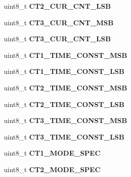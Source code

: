 \begin{DoxyCompactItemize}
uint8\+\_\+t {\bfseries C\+T2\+\_\+\+C\+U\+R\+\_\+\+C\+N\+T\+\_\+\+L\+SB}
\item 
\mbox{\label{structz8036__map_aee4739d98749539047473eef94277364}} 
uint8\+\_\+t {\bfseries C\+T3\+\_\+\+C\+U\+R\+\_\+\+C\+N\+T\+\_\+\+M\+SB}
\item 
\mbox{\label{structz8036__map_afe431c0216327e621cdda57400240973}} 
uint8\+\_\+t {\bfseries C\+T3\+\_\+\+C\+U\+R\+\_\+\+C\+N\+T\+\_\+\+L\+SB}
\item 
\mbox{\label{structz8036__map_a1160f997ce2f00802e51a343f841c7df}} 
uint8\+\_\+t {\bfseries C\+T1\+\_\+\+T\+I\+M\+E\+\_\+\+C\+O\+N\+S\+T\+\_\+\+M\+SB}
\item 
\mbox{\label{structz8036__map_a07036d89ff7a6fd4551b4078acbe1fe2}} 
uint8\+\_\+t {\bfseries C\+T1\+\_\+\+T\+I\+M\+E\+\_\+\+C\+O\+N\+S\+T\+\_\+\+L\+SB}
\item 
\mbox{\label{structz8036__map_a5f6a1c30e3b8a523b80a73dfcb18fc10}} 
uint8\+\_\+t {\bfseries C\+T2\+\_\+\+T\+I\+M\+E\+\_\+\+C\+O\+N\+S\+T\+\_\+\+M\+SB}
\item 
\mbox{\label{structz8036__map_aec5b998f09cd4056da3cc668da5f6c2e}} 
uint8\+\_\+t {\bfseries C\+T2\+\_\+\+T\+I\+M\+E\+\_\+\+C\+O\+N\+S\+T\+\_\+\+L\+SB}
\item 
\mbox{\label{structz8036__map_adcd19565ff0cb11a7b6ddda97565aa14}} 
uint8\+\_\+t {\bfseries C\+T3\+\_\+\+T\+I\+M\+E\+\_\+\+C\+O\+N\+S\+T\+\_\+\+M\+SB}
\item 
\mbox{\label{structz8036__map_a7b83b0b1a66e34388703e5ca545af741}} 
uint8\+\_\+t {\bfseries C\+T3\+\_\+\+T\+I\+M\+E\+\_\+\+C\+O\+N\+S\+T\+\_\+\+L\+SB}
\item 
\mbox{\label{structz8036__map_a2adba169441df867f2efa7e0c241fae3}} 
uint8\+\_\+t {\bfseries C\+T1\+\_\+\+M\+O\+D\+E\+\_\+\+S\+P\+EC}
\item 
\mbox{\label{structz8036__map_a2cd8ceeb3fe071d89bede7316b99c16b}} 
uint8\+\_\+t {\bfseries C\+T2\+\_\+\+M\+O\+D\+E\+\_\+\+S\+P\+EC}

\end{DoxyCompactItemize}
